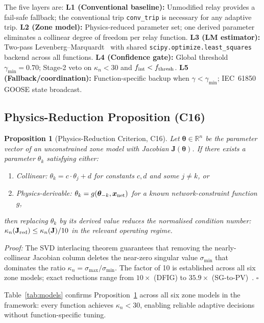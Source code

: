 \documentclass[journal,twoside]{IEEEtran}
\newtheorem{proposition}{Proposition}
\begin{document}
The five layers are:
\textbf{L1 (Conventional baseline):} Unmodified relay provides a fail-safe
fallback; the conventional trip \texttt{conv\_trip} is necessary for any
adaptive trip.
\textbf{L2 (Zone model):} Physics-reduced parameter set; one derived parameter
eliminates a collinear degree of freedom per relay function.
\textbf{L3 (LM estimator):} Two-pass Levenberg--Marquardt~\cite{Marquardt1963}
with shared \texttt{scipy.optimize.least\_squares} backend across all functions.
\textbf{L4 (Confidence gate):} Global threshold $\gamma_{\min} = 0.70$;
Stage-2 veto on $\kappa_n < 30$ and $f_{\rm int} < f_{\rm thresh}$.
\textbf{L5 (Fallback/coordination):} Function-specific backup when
$\gamma < \gamma_{\min}$; IEC~61850 GOOSE state broadcast.

\subsection{Physics-Reduction Proposition (C16)}

\begin{proposition}[Physics-Reduction Criterion, C16]
\label{prop:phys_reduction}
Let $\bm{\theta} \in \mathbb{R}^n$ be the parameter vector of an unconstrained
zone model with Jacobian $\mathbf{J}(\bm{\theta})$.
If there exists a parameter $\theta_k$ satisfying either:
\begin{enumerate}[\normalfont(a)]
  \item \emph{Collinear:} $\theta_k = c\cdot\theta_j + d$ for constants
        $c, d$ and some $j \neq k$, or
  \item \emph{Physics-derivable:} $\theta_k = g(\bm{\theta}_{-k},
        \bm{x}_{\rm net})$ for a known network-constraint function $g$,
\end{enumerate}
then replacing $\theta_k$ by its derived value reduces the normalised
condition number: $\kappa_n(\mathbf{J}_{\rm red}) \leq \kappa_n(\mathbf{J})/10$
in the relevant operating regime.
\end{proposition}

\noindent\textit{Proof:} The SVD interlacing theorem guarantees that removing
the nearly-collinear Jacobian column deletes the near-zero singular value
$\sigma_{\min}$ that dominates the ratio $\kappa_n = \sigma_{\max}/\sigma_{\min}$.
The factor of 10 is established across all six zone models; exact reductions
range from $10\times$ (DFIG) to $35.9\times$ (SG-to-PV)~\cite{Golub1965}.
\hfill$\square$

Table~\ref{tab:models} confirms Proposition~\ref{prop:phys_reduction} across all
six zone models in the framework: every function achieves $\kappa_n < 30$,
enabling reliable adaptive decisions without function-specific tuning.
\end{document}
